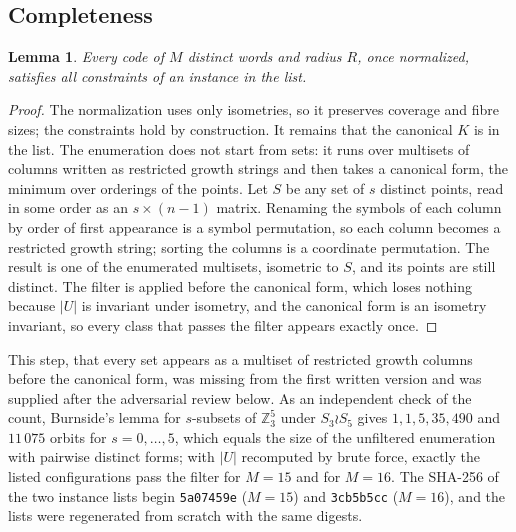 \documentclass[11pt]{amsart}
\newtheorem{lemma}[theorem]{Lemma}
\theoremstyle{definition}
\theoremstyle{remark}
\begin{document}
\subsection*{Completeness}
\begin{lemma}\label{lem:complete}
Every code of $M$ distinct words and radius $R$, once normalized, satisfies all constraints of an instance in the list.
\end{lemma}
\begin{proof}
The normalization uses only isometries, so it preserves coverage and fibre sizes; the constraints hold by construction.
It remains that the canonical $K$ is in the list.
The enumeration does not start from sets: it runs over multisets of columns written as restricted growth strings and then takes a canonical form, the minimum over orderings of the points.
Let $S$ be any set of $s$ distinct points, read in some order as an $s\times(n-1)$ matrix. Renaming the symbols of each column by order of first appearance is a symbol permutation, so each column becomes a restricted growth string; sorting the columns is a coordinate permutation. The result is one of the enumerated multisets, isometric to $S$, and its points are still distinct.
The filter is applied before the canonical form, which loses nothing because $|U|$ is invariant under isometry, and the canonical form is an isometry invariant, so every class that passes the filter appears exactly once.
\end{proof}
This step, that every set appears as a multiset of restricted growth columns before the canonical form, was missing from the first written version and was supplied after the adversarial review below.
As an independent check of the count, Burnside's lemma for $s$-subsets of $\mathbb{Z}_3^5$ under $S_3\wr S_5$ gives $1,1,5,35,490$ and $11\,075$ orbits for $s=0,\dots,5$, which equals the size of the unfiltered enumeration with pairwise distinct forms; with $|U|$ recomputed by brute force, exactly the listed configurations pass the filter for $M=15$ and for $M=16$.
The SHA-256 of the two instance lists begin \texttt{5a07459e} ($M=15$) and \texttt{3cb5b5cc} ($M=16$), and the lists were regenerated from scratch with the same digests.
\end{document}
